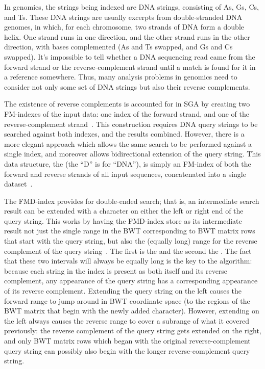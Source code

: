 In genomics, the strings being indexed are DNA strings, consisting of As, Gs, Cs, and Ts. These DNA strings are usually excerpts from double-stranded DNA genomes, in which, for each chromosome, two strands of DNA form a double helix. One strand runs in one direction, and the other strand runs in the other direction, with bases complemented (As and Ts swapped, and Gs and Cs swapped). It's impossible to tell whether a DNA sequencing read came from the forward strand or the reverse-complement strand until a match is found for it in a reference somewhere. Thus, many analysis problems in genomics need to consider not only some set of DNA strings but also their reverse complements.

The existence of reverse complements is accounted for in SGA by creating two FM-indexes of the input data: one index of the forward strand, and one of the reverse-complement strand~\cite{simpson2012efficient}. This construction requires DNA query strings to be searched against both indexes, and the results combined. However, there is a more elegant approach which allows the same search to be performed against a single index, and moreover allows bidirectional extension of the query string. This data structure, the  (the ``D'' is for ``DNA''), is simply an FM-index of both the forward and reverse strands of all input sequences, concatenated into a single dataset~\cite{li2012exploring}.

The FMD-index provides for double-ended search; that is, an intermediate search result can be extended with a character on either the left or right end of the query string. This works by having the FMD-index store as its intermediate result not just the single range in the BWT corresponding to BWT matrix rows that start with the query string, but also the (equally long) range for the reverse complement of the query string~\cite{li2012exploring}. The first is the  and the second the . The fact that these two intervals will always be equally long is the key to the algorithm: because each string in the index is present as both itself and its reverse complement, any appearance of the query string has a corresponding appearance of its reverse complement. Extending the query string on the left causes the forward range to jump around in BWT coordinate space (to the regions of the BWT matrix that begin with the newly added character). However, extending on the left always causes the reverse range to cover a subrange of what it covered previously: the reverse complement of the query string gets extended on the right, and only BWT matrix rows which began with the original reverse-complement query string can possibly also begin with the longer reverse-complement query string.

